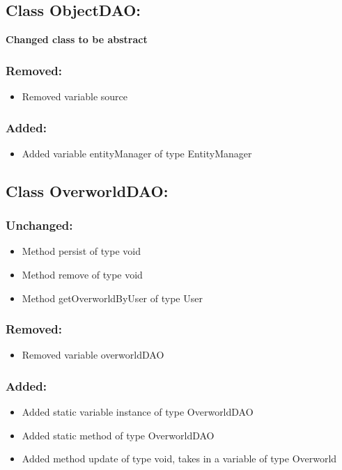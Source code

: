 \documentclass{article}
\begin{document}

\subsection{Class ObjectDAO:}

\textbf{Changed class to be abstract}

\subsubsection{Removed:}
\begin{itemize}
\item Removed variable source
\end{itemize}

\subsubsection{Added:}
\begin{itemize}
\item Added variable entityManager of type EntityManager
\end{itemize}


\subsection{Class OverworldDAO:}

\subsubsection{Unchanged:}
\begin{itemize}
\item Method persist of type void
\item Method remove of type void
\item Method getOverworldByUser of type User
\end{itemize}

\subsubsection{Removed:}
\begin{itemize}
\item Removed variable overworldDAO
\end{itemize}

\subsubsection{Added:}
\begin{itemize}
\item Added static variable instance of type OverworldDAO
\item Added static method of type OverworldDAO
\item Added method update of type void, takes in a variable of type Overworld
\end{itemize}
\end{document}
